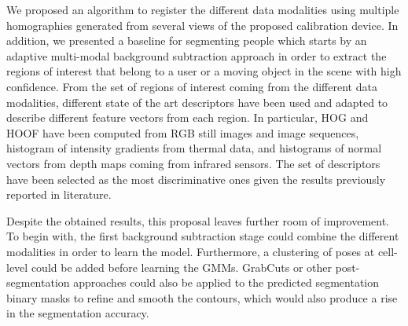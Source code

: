 \documentclass[10pt,twocolumn,letterpaper]{article}
\begin{document}
We proposed an algorithm to register the different data modalities using multiple homographies generated from several views of the proposed calibration device. In addition, we presented a baseline for segmenting people which starts by an adaptive multi-modal background subtraction approach in order to extract the regions of interest that belong to a user or a moving object in the scene with high confidence. From the set of regions of interest coming
from the different data modalities, different state of the art descriptors have been used
and adapted to describe different feature vectors from each region. In particular, HOG and HOOF have been computed from RGB still images and image sequences, histogram of intensity gradients from thermal data, and histograms of normal vectors from depth maps coming from infrared sensors. The set of descriptors have been selected as the most discriminative ones given the results previously reported in literature.

Despite the obtained results, this proposal leaves further room of improvement. To
begin with, the first background subtraction stage could combine the different modalities
in order to learn the model. Furthermore, a clustering of poses at cell-level could be
added before learning the GMMs. GrabCuts or other post-segmentation approaches could also be applied to the predicted
segmentation binary masks to refine and smooth the contours, which would also produce
a rise in the segmentation accuracy.
{\small


}
\end{document}
